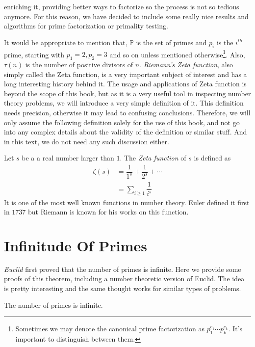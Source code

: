 \documentclass{subfiles}
\begin{document}
enriching it, providing better ways to factorize so the process is not so tedious anymore. For this reason, we have decided to include some really nice results and algorithms for prime factorization or primality testing.

	It would be appropriate to mention that, $\mathbb{P}$ is the set of primes and $p_i$ is the $i^{th}$ prime, starting with $p_1=2,p_2=3$ and so on unless mentioned otherwise\footnote{Sometimes we may denote the canonical prime factorization as $p_1^{e_1}\cdots p_k^{e_k}$. It's important to distinguish between them.}. Also, $\tau(n)$ is the number of positive divisors of $n$. \textit{Riemann's Zeta function}, also simply called the Zeta function, is a very important subject of interest and has a long interesting history behind it. The usage and applications of Zeta function is beyond the scope of this book, but as it is a very useful tool in inspecting number theory problems, we will introduce a very simple definition of it. This definition needs precision, otherwise it may lead to confusing conclusions. Therefore, we will only assume the following definition solely for the use of this book, and not go into any complex details about the validity of the definition or similar stuff. And in this text, we do not need any such discussion either.
		\begin{definition}
			Let $s$ be a a real number larger than $1$. The \textit{Zeta function} of $s$ is defined as
				\begin{align*}
					\zeta(s)
						& =\dfrac{1}{1^s}+\dfrac{1}{2^s}+\cdots\\
						& =\sum_{i\geq1}\dfrac{1}{i^s}
				\end{align*}
			It is one of the most well known functions in number theory. Euler defined it first in $1737$ but Riemann is known for his works on this function.
		\end{definition}
	\section{Infinitude Of Primes}
	\label{sec:infiniteprimes}
	\textit{Euclid} first proved that the number of primes is infinite. Here we provide some proofs of this theorem, including a number theoretic version of Euclid. The idea is pretty interesting and the same thought works for similar types of problems.
		\begin{theorem}
			The number of primes is infinite.
		\end{theorem}
\end{document}
